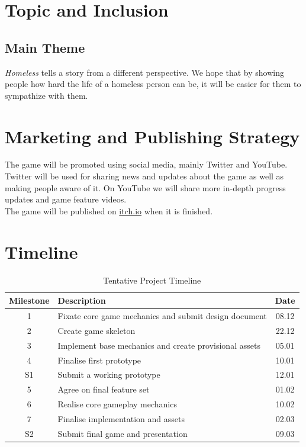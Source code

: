 \documentclass[a4paper]{scrreprt}
\begin{document}


\chapter{Topic and Inclusion }
\section{Main Theme}
\textit{Homeless} tells a story from a different perspective. 
We hope that by showing people how hard the life of a homeless person can be, it will be easier for them to sympathize with them.



\chapter{Marketing and Publishing Strategy}
The game will be promoted using social media, mainly Twitter and YouTube. Twitter will be used for sharing news and updates about the game as well as making people aware of it. On YouTube we will share more in-depth progress updates and game feature videos.\\
The game will be published on \hyperlink{https://itch.io/}{itch.io} when it is finished.





\chapter{Timeline}
\begin{table}[h]
\centering
\begin{tabular}{|c|l|c|}
\hline
Milestone & Description & Date \\\hline
1 & Fixate core game mechanics and submit design document  & 08.12 \\
2 & Create game skeleton & 22.12 \\
3 & Implement base mechanics and create provisional assets & 05.01 \\
4 & Finalise first prototype & 10.01 \\
S1 & Submit a working prototype & 12.01 \\
5 & Agree on final feature set & 01.02 \\
6 & Realise core gameplay mechanics & 10.02 \\
7 & Finalise implementation and assets & 02.03 \\
S2 & Submit final game and presentation & 09.03 \\
\hline
\end{tabular}
\caption{\label{tab:schedule}Tentative Project Timeline}
\end{table}
\end{document}
